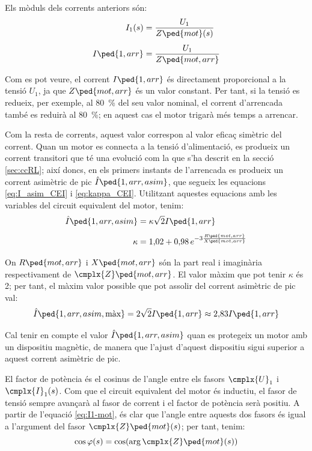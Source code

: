 Els mòduls dels corrents anteriors són:
\begin{subequations}
\begin{align}
    I_1(s) &= \frac{U_1}{Z\ped{mot}(s)} \label{eq:mot-I1}\\[1ex]
    I\ped{1,arr} &= \frac{U_1}{Z\ped{mot,arr}}\label{eq:mot-Iarr}
\end{align}
\end{subequations}

Com es pot veure, el corrent $I\ped{1,arr}$ és directament proporcional a la tensió $U_1$, ja que $Z\ped{mot,arr}$ és un valor constant. Per tant, si la tensió es redueix, per exemple, al \qty{80}{\%} del seu valor nominal, el corrent d'arrencada també es reduirà al \qty{80}{\%}; en aquest cas el motor trigarà més temps a arrencar.

Com la resta de corrents, aquest valor correspon al valor eficaç simètric del corrent. Quan un motor es connecta a la tensió d'alimentació, es produeix un corrent transitori que té una evolució com la que s'ha descrit en la secció \vref{sec:ccRL}; així doncs, en els primers instants de l'arrencada es produeix un corrent asimètric de pic $\hat{I}\ped{1,arr,asim}$, que segueix les equacions \eqref{eq:I_asim_CEI} i \eqref{eq:kappa_CEI}. Utilitzant aquestes equacions amb les variables del circuit equivalent del motor, tenim:
\begin{subequations}
\begin{align}
    \hat{I}\ped{1,arr,asim} &= \kappa \sqrt{2} I\ped{1,arr}  \\[1ex]
    \kappa &= 1{,}02 + 0{,}98 \,e^{-3\frac{R\ped{mot,arr}}{X\ped{mot,arr}}}
\end{align}
\end{subequations}

On $R\ped{mot,arr}$ i $X\ped{mot,arr}$ són la part real i imaginària respectivament de $\cmplx{Z}\ped{mot,arr}$. El valor màxim que pot tenir  $\kappa$ és 2;  per tant, el màxim valor possible que pot assolir del corrent asimètric de pic val:
\begin{equation}
	\hat{I}\ped{1,arr,asim,\text{màx}} =  2\sqrt{2} I\ped{1,arr} \approx 2{,}83 I\ped{1,arr} 
\end{equation}

Cal tenir en compte el valor $\hat{I}\ped{1,arr,asim}$ quan es protegeix un motor amb un dispositiu magnètic, de manera que l'ajust d'aquest dispositiu sigui superior a aquest corrent asimètric de  pic.

El factor de potència és el cosinus de l'angle entre els fasors $\cmplx{U}_1$ i $\cmplx{I}_1(s)$. Com que el circuit equivalent del motor és inductiu, el fasor de tensió sempre avançarà al fasor de corrent i el factor de potència serà positiu. A partir de l'equació \eqref{eq:I1-mot}, és clar que l'angle entre aquests dos fasors és igual a l'argument del fasor $\cmplx{Z}\ped{mot}(s)$; per tant, tenim:
\begin{equation}\index{motors d'inducció!factor de potència}
	\cos\varphi(s) = \cos(\arg\cmplx{Z}\ped{mot}(s))\label{eq:cos-fi-mot}
\end{equation}

